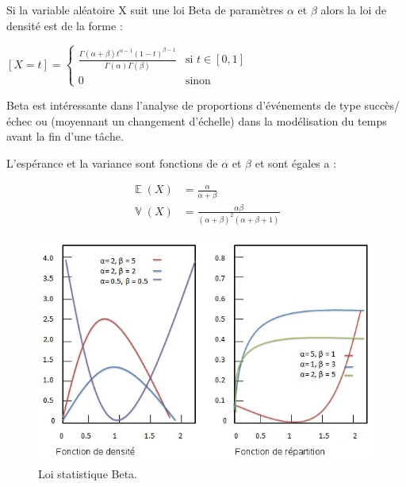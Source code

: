 \documentclass[a4paper,12pt]{report}
\DeclareMathOperator{\E}{\mathbb{E}} %
\DeclareMathOperator{\V}{\mathbb{V}} %
\theoremstyle{plain}				%
\theoremstyle{definition}				%
\begin{document}

Si la variable aléatoire X suit une loi Beta de paramètres $\alpha$ et $\beta$ alors la loi de densité est de la forme :
  \begin{center}
  $[X=t] = \left\{
    \begin{array}{ll}
    \frac{\Gamma(\alpha + \beta) t^{\alpha-1} (1-t)^{\beta-1}}{\Gamma(\alpha) \Gamma(\beta)}
    & 
   	\mbox{si } t \in [0,1]  \\
        0 & 
        \mbox{sinon}
    \end{array}
	\right.$
  \label{definitionLoiBetaDensite}
  \end{center}

Beta est intéressante dans l'analyse de proportions d’événements de type succès/échec ou
(moyennant un changement d'échelle) dans la modélisation du temps avant la fin d'une tâche.

L’espérance et la variance sont fonctions de $\alpha$ et $\beta$ et sont égales a :

\begin{align*}
	\E(X) &= \frac{\alpha}{\alpha + \beta} \\
	\V(X) &= \frac{\alpha \beta}{(\alpha + \beta)^2 (\alpha + \beta + 1)} 
\end{align*}

\begin{figure}
{\centering
\includegraphics[width=\columnwidth]{loiStatBeta.png}
\caption{Loi statistique Beta.}
\label{fig:LoiStatistiquesBeta}
\par}
\end{figure}
\end{document}
